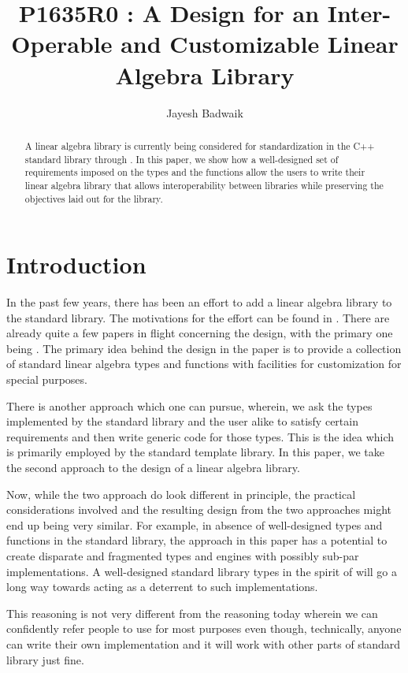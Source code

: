 \documentclass[oneside,11pt,a4paper]{jbarticle}
\subtitle{}
\title{P1635R0 : A Design for an Inter-Operable and Customizable Linear Algebra Library}
\author{Jayesh Badwaik}
\begin{document}
\maketitle[\value{page}]
\begin{abstract}
  A linear algebra library is currently being considered for standardization in
  the C++ standard library through \cite{GuyDavidson2019}.
  In this paper, we show how a well-designed set of requirements imposed on the
  types and the functions allow the users to write their linear algebra library
  that allows interoperability between libraries while preserving the objectives
  laid out for the library.
\end{abstract}

\section{Introduction}

In the past few years, there has been an effort to add a linear algebra library
to the standard library. The motivations for the effort can be found in
\cite{GuyDavidson2019a}. There are already quite a few papers in flight
concerning the design, with the primary one being \cite{GuyDavidson2019}. The
primary idea behind the design in the paper is to provide a collection of
standard linear algebra types and functions with facilities for customization
for special purposes.

There is another approach which one can pursue, wherein, we ask the
types implemented by the standard library and the user alike to satisfy certain
requirements and then write generic code for those types. This is the idea which
is primarily employed by the standard template library.
In this paper, we take the second approach to the design of a linear algebra
library.

Now, while the two approach do look different in principle, the
practical considerations involved and the resulting design from the two
approaches might end up being  very similar.  For example, in absence of
well-designed types and functions in the standard library, the approach in this
paper has a potential to create disparate and fragmented types and engines with
possibly sub-par implementations.  A well-designed standard library types in the
spirit of \cite{GuyDavidson2019} will go a long way towards acting as a
deterrent to such implementations.

This reasoning is not very different from the reasoning today wherein we can
confidently refer people to use  for most purposes even
though, technically, anyone can write their own 
implementation and it will work with other parts of standard library just fine.
\end{document}
